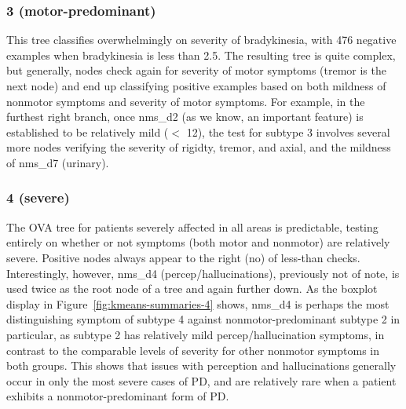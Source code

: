 \documentclass[10pt]{article}
\begin{document}
\begin{multicols}{2}

\subsubsection{3 (motor-predominant)}

This tree classifies overwhelmingly on severity of bradykinesia, with 476
negative examples when bradykinesia is less than 2.5. The resulting tree is
quite complex, but generally, nodes check again for severity of motor
symptoms (tremor is the next node) and end up classifying positive examples
based on both mildness of nonmotor symptoms and severity of motor symptoms. For
example, in the furthest right branch, once nms\_d2 (as we know, an important
feature) is established to be relatively mild ($<$ 12), the test for subtype 3
involves several more nodes verifying the severity of rigidty, tremor, and
axial, and the mildness of nms\_d7 (urinary).

\subsubsection{4 (severe)}

The OVA tree for patients severely affected in all areas is predictable, testing
entirely on whether or not symptoms (both motor and nonmotor) are relatively
severe. Positive nodes always appear to the right (no) of less-than checks.
Interestingly, however, nms\_d4 (percep/hallucinations), previously not of note, is used twice as the
root node of a tree and again further down. As the boxplot display in
Figure~\ref{fig:kmeans-summaries-4} shows, nms\_d4 is perhaps the most
distinguishing symptom of subtype 4 against nonmotor-predominant
subtype 2 in particular, as subtype 2 has relatively mild percep/hallucination
symptoms, in contrast to the comparable levels of severity for other nonmotor
symptoms in both groups. This shows that issues with perception and
hallucinations generally occur in only the most severe cases of PD, and are
relatively rare when a patient exhibits a nonmotor-predominant form of PD.


\end{multicols}
\end{document}
